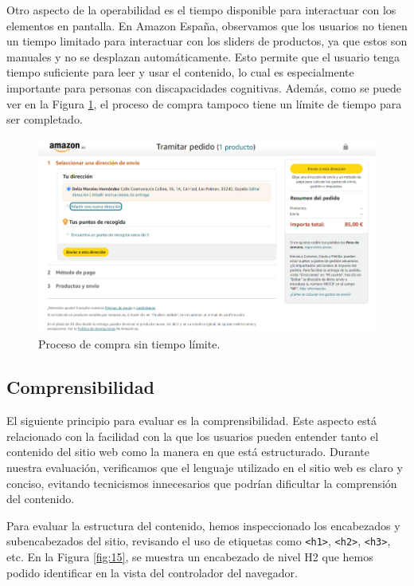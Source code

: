 \documentclass[letterpaper, 12pt]{report}
\begin{document}
Otro aspecto de la operabilidad es el tiempo disponible para interactuar con los elementos en pantalla. En Amazon España, observamos que los usuarios no tienen un tiempo limitado para interactuar con los sliders de productos, ya que estos son manuales y no se desplazan automáticamente. Esto permite que el usuario tenga tiempo suficiente para leer y usar el contenido, lo cual es especialmente importante para personas con discapacidades cognitivas. Además, como se puede ver en la Figura \ref{fig:14}, el proceso de compra tampoco tiene un límite de tiempo para ser completado.

\begin{figure}[H]
\centering
\includegraphics[width=1\textwidth]{figure14.png}
\caption{Proceso de compra sin tiempo límite.}
\label{fig:14}
\end{figure}

\subsection{Comprensibilidad}

El siguiente principio para evaluar es la comprensibilidad. Este aspecto está relacionado con la facilidad con la que los usuarios pueden entender tanto el contenido del sitio web como la manera en que está estructurado. Durante nuestra evaluación, verificamos que el lenguaje utilizado en el sitio web es claro y conciso, evitando tecnicismos innecesarios que podrían dificultar la comprensión del contenido.

Para evaluar la estructura del contenido, hemos inspeccionado los encabezados y subencabezados del sitio, revisando el uso de etiquetas como \texttt{<h1>}, \texttt{<h2>}, \texttt{<h3>}, etc. En la Figura \ref{fig:15}, se muestra un encabezado de nivel H2 que hemos podido identificar en la vista del controlador del navegador.
\end{document}
